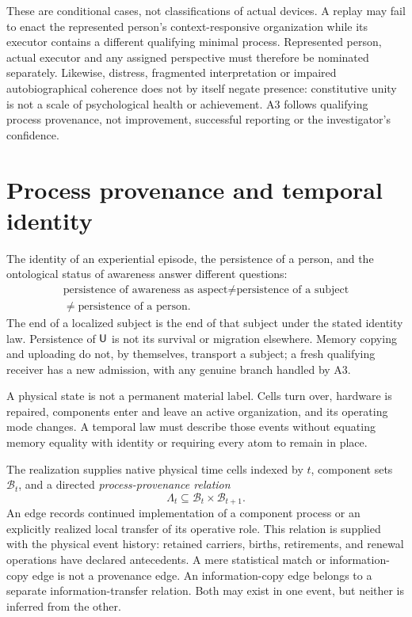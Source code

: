 These are conditional cases, not classifications of actual devices. A replay may fail to enact the represented person's context-responsive organization while its executor contains a different qualifying minimal process. Represented person, actual executor and any assigned perspective must therefore be nominated separately. Likewise, distress, fragmented interpretation or impaired autobiographical coherence does not by itself negate presence: constitutive unity is not a scale of psychological health or achievement. A3 follows qualifying process provenance, not improvement, successful reporting or the investigator's confidence.

\section{Process provenance and temporal identity}\label{sec:lineage-process}
The identity of an experiential episode, the persistence of a person, and the ontological status of awareness answer different questions:
\[
\boxed{\begin{gathered}
\text{persistence of awareness as aspect}\neq\text{persistence of a subject}\\
\neq\text{persistence of a person}.
\end{gathered}}
\]
The end of a localized subject is the end of that subject under the stated identity law. Persistence of $\mathsf{U}$ is not its survival or migration elsewhere. Memory copying and uploading do not, by themselves, transport a subject; a fresh qualifying receiver has a new admission, with any genuine branch handled by A3.

A physical state is not a permanent material label. Cells turn over, hardware is repaired, components enter and leave an active organization, and its operating mode changes. A temporal law must describe those events without equating memory equality with identity or requiring every atom to remain in place.

The realization supplies native physical time cells indexed by $t$, component sets $\mathcal B_t$, and a directed \emph{process-provenance relation}
\[
\Lambda_t\subseteq\mathcal B_t\times\mathcal B_{t+1}.
\]
An edge records continued implementation of a component process or an explicitly realized local transfer of its operative role. This relation is supplied with the physical event history: retained carriers, births, retirements, and renewal operations have declared antecedents. A mere statistical match or information-copy edge is not a provenance edge. An information-copy edge belongs to a separate information-transfer relation. Both may exist in one event, but neither is inferred from the other.

